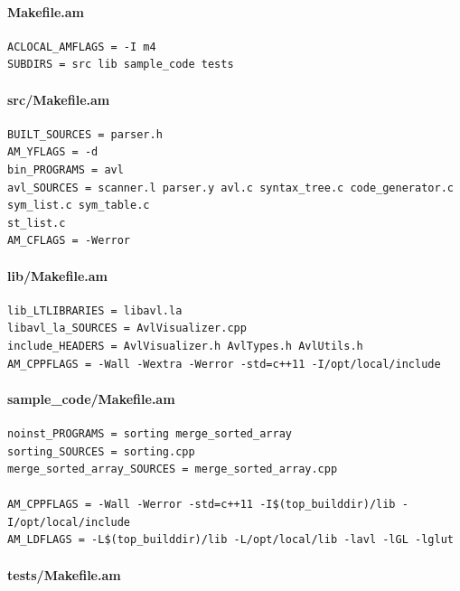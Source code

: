 \paragraph{Makefile.am}

\begin{verbatim}
ACLOCAL_AMFLAGS = -I m4
SUBDIRS = src lib sample_code tests
\end{verbatim}

\paragraph{src/Makefile.am}

\begin{verbatim}
BUILT_SOURCES = parser.h
AM_YFLAGS = -d
bin_PROGRAMS = avl
avl_SOURCES = scanner.l parser.y avl.c syntax_tree.c code_generator.c sym_list.c sym_table.c
st_list.c
AM_CFLAGS = -Werror
\end{verbatim}

\paragraph{lib/Makefile.am}

\begin{verbatim}
lib_LTLIBRARIES = libavl.la
libavl_la_SOURCES = AvlVisualizer.cpp
include_HEADERS = AvlVisualizer.h AvlTypes.h AvlUtils.h
AM_CPPFLAGS = -Wall -Wextra -Werror -std=c++11 -I/opt/local/include
\end{verbatim}

\paragraph{sample\_code/Makefile.am}

\begin{verbatim}
noinst_PROGRAMS = sorting merge_sorted_array
sorting_SOURCES = sorting.cpp
merge_sorted_array_SOURCES = merge_sorted_array.cpp

AM_CPPFLAGS = -Wall -Werror -std=c++11 -I$(top_builddir)/lib -I/opt/local/include
AM_LDFLAGS = -L$(top_builddir)/lib -L/opt/local/lib -lavl -lGL -lglut
\end{verbatim}

\paragraph{tests/Makefile.am}

